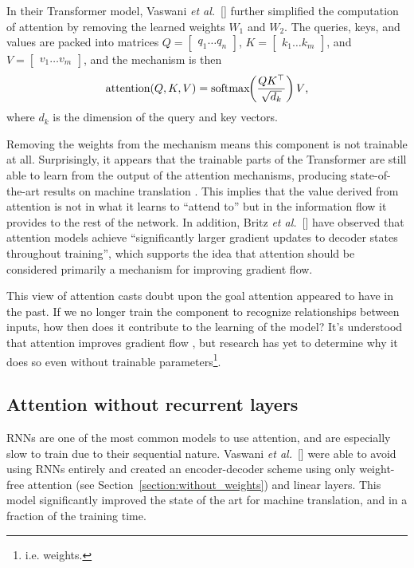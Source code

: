 \documentclass{article}
\newcommand{\etal}{\textit{et al.}}
\begin{document}
In their Transformer model, Vaswani \etal~[\citeyear{attn_all_you_need}] further simplified the computation of attention by removing the learned weights $W_1$ and $W_2$. The queries, keys, and values are packed into matrices $Q=\begin{bmatrix} q_1 \hdots q_n \end{bmatrix}$, $K=\begin{bmatrix} k_1 \hdots k_m \end{bmatrix}$, and $V=\begin{bmatrix} v_1 \hdots v_m \end{bmatrix}$, and the mechanism is then
\[
\text{attention}(Q,K,V)=\text{softmax}\hspace{-0.6ex}\left(\frac{QK^\top}{\sqrt{d_k}}\right)V\text,
\]
where $d_k$ is the dimension of the query and key vectors.

Removing the weights from the mechanism means this component is not trainable at all. Surprisingly, it appears that the trainable parts of the Transformer are still able to learn from the output of the attention mechanisms, producing state-of-the-art results on machine translation \cite{attn_all_you_need}. This implies that the value derived from attention is not in what it learns to ``attend to'' but in the information flow it provides to the rest of the network. In addition, Britz \etal~[\citeyear{massive_exploration}] have observed that attention models achieve ``significantly larger gradient updates to decoder states throughout training'', which supports the idea that attention should be considered primarily a mechanism for improving gradient flow.

This view of attention casts doubt upon the goal attention appeared to have in the past. If we no longer train the component to recognize relationships between inputs, how then does it contribute to the learning of the model? It's understood that attention improves gradient flow \cite{massive_exploration}, but research has yet to determine why it does so even without trainable parameters\footnote{i.e. weights.}.

\subsection{Attention without recurrent layers}

RNNs are one of the most common models to use attention, and are especially slow to train due to their sequential nature. Vaswani \etal~[\citeyear{attn_all_you_need}] were able to avoid using RNNs entirely and created an encoder-decoder scheme using only weight-free attention (see Section~\ref{section:without_weights}) and linear layers. This model significantly improved the state of the art for machine translation, and in a fraction of the training time.
\end{document}
